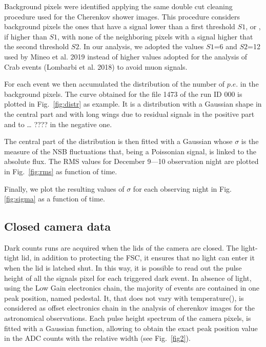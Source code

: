 Background pixels were identified applying the same double cut cleaning procedure used for the Cherenkov shower images. This procedure considers background pixels the ones that have a signal lower than a first threshold $S1$, or , if higher than $S1$, with none of the neighboring pixels with a signal higher that the second threshold $S2$. In our analysis, we adopted the values $S1$=6 and $S2$=12 used by Mineo et al. 2019 instead of higher values adopted for the analysis of Crab events (Lombarbi et al. 2018) to avoid muon signals.

For each event we then accumulated the distribution of the number of $p.e.$ in the background pixels. The curve obtained for the file 1473 of the run ID 000 is plotted in Fig.~\ref{fig:distr} as example. It is a distribution with a Gaussian shape in the central part and with long wings due to residual signals in the positive part and to … ???? in the negative one. 

The central part of the distribution is then fitted with a Gaussian whose $\sigma$ is the measure of the NSB fluctuations that, being a Poissonian signal, is linked to the absolute flux. The RMS values for December 9—10 observation night are plotted in Fig.~\ref{fig:rms} as function of time.

Finally, we plot the resulting values of $\sigma$ for each observing night in Fig.\ref{fig:sigma}  as a function of time. 


\subsection{Closed camera data} 




Dark counts runs are acquired when the lids of the camera are closed.
The light-tight lid, in addition to protecting the FSC, it ensures that no light can enter it when the lid is latched shut. In this way, it is possible to read out the pulse height of all the signals pixel for each triggered dark event.
In absence of light, using the Low Gain electronics chain, the majority of events are  contained in one peak position, named pedestal. 
It, that does not vary with temperature(\cite{Impiombato2016}), is considered as offset electronics chain in the analysis of cherenkov images for the astronomical observations.
Each pulse height spectrum of the camera pixels, is fitted with a Gaussian function, allowing to obtain the exact peak position value in the ADC counts with the relative width (see Fig.~\ref{fig2}).


